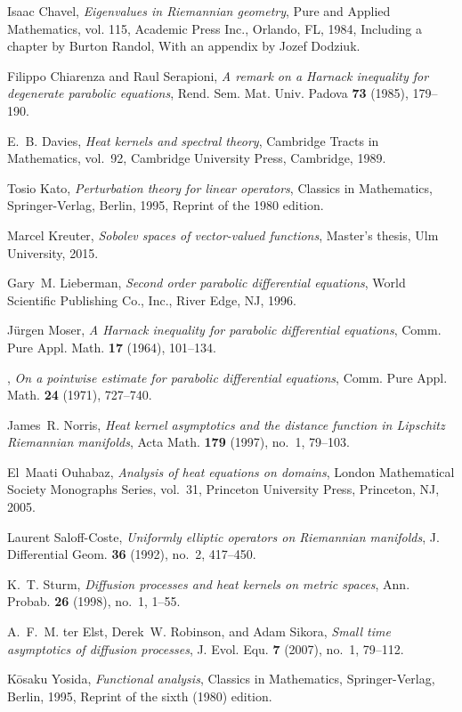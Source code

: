 \documentclass[a4paper, 12pt]{amsart}
\numberwithin{equation}{section}
\renewcommand{\~}{\tilde}
\renewcommand{\-}{\bar}
\newcommand{\8}{\infty}
\begin{document}
\begin{thebibliography}{AKM06}
Isaac Chavel, \emph{Eigenvalues in {R}iemannian geometry}, Pure and Applied
  Mathematics, vol. 115, Academic Press Inc., Orlando, FL, 1984, Including a
  chapter by Burton Randol, With an appendix by Jozef Dodziuk. 

Filippo Chiarenza and Raul Serapioni, \emph{A remark on a {H}arnack inequality
  for degenerate parabolic equations}, Rend. Sem. Mat. Univ. Padova \textbf{73}
  (1985), 179--190. 

E.~B. Davies, \emph{Heat kernels and spectral theory}, Cambridge Tracts in
  Mathematics, vol.~92, Cambridge University Press, Cambridge, 1989. 

Tosio Kato, \emph{Perturbation theory for linear operators}, Classics in
  Mathematics, Springer-Verlag, Berlin, 1995, Reprint of the 1980 edition.

Marcel Kreuter, \emph{Sobolev spaces of vector-valued functions}, Master's
  thesis, Ulm University, 2015.

Gary~M. Lieberman, \emph{Second order parabolic differential equations}, World
  Scientific Publishing Co., Inc., River Edge, NJ, 1996. 

J\"urgen Moser, \emph{A {H}arnack inequality for parabolic differential
  equations}, Comm. Pure Appl. Math. \textbf{17} (1964), 101--134. 

\bysame, \emph{On a pointwise estimate for parabolic differential equations},
  Comm. Pure Appl. Math. \textbf{24} (1971), 727--740. 

James~R. Norris, \emph{Heat kernel asymptotics and the distance function in
  {L}ipschitz {R}iemannian manifolds}, Acta Math. \textbf{179} (1997), no.~1,
  79--103. 

El~Maati Ouhabaz, \emph{Analysis of heat equations on domains}, London
  Mathematical Society Monographs Series, vol.~31, Princeton University Press,
  Princeton, NJ, 2005. 

Laurent Saloff-Coste, \emph{Uniformly elliptic operators on {R}iemannian
  manifolds}, J. Differential Geom. \textbf{36} (1992), no.~2, 417--450.

K.~T. Sturm, \emph{Diffusion processes and heat kernels on metric spaces}, Ann.
  Probab. \textbf{26} (1998), no.~1, 1--55. 

A.~F.~M. ter Elst, Derek~W. Robinson, and Adam Sikora, \emph{Small time
  asymptotics of diffusion processes}, J. Evol. Equ. \textbf{7} (2007), no.~1,
  79--112. 

K\=osaku Yosida, \emph{Functional analysis}, Classics in Mathematics,
  Springer-Verlag, Berlin, 1995, Reprint of the sixth (1980) edition.

\end{thebibliography}

\setlength{\parskip}{0mm}
\end{document}
